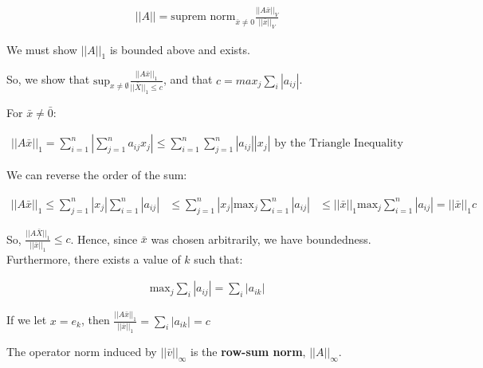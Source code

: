 \begin{align*}
  ||A|| = \text{suprem norm}_{\bar{x} \neq 0} \frac{||A\bar{x}||_V}{||\bar{x}||_V}
\end{align*}

We must show $||A||_1$ is bounded above and exists.

So, we show that $\text{sup}_{x \neq \emptyset} \frac{||A\bar{x}||_1}{||\bar{X}||_1 \leq c}$, and that $c = max_j \sum_i |a_{ij}|$.

For $\bar{x} \neq \bar{0}$:

\begin{align*}
  ||A\bar{x}||_1 = \sum_{i=1}^n |\sum_{j=1}^n a_{ij} x_j| \leq \sum_{i=1}^n \sum_{j=1}^n |a_{ij}| |x_j|\text{ by the Triangle Inequality}
\end{align*}

We can reverse the order of the sum:

\begin{align*}
  ||A\bar{x}||_1 \leq \sum_{j=1}^n |x_j| \sum_{i=1}^n |a_{ij}| &\leq \sum_{j=1}^n |x_j| \text{max}_j \sum_{i=1}^n |a_{ij}|
  &\leq ||\bar{x}||_1 \text{max}_j \sum_{i=1}^n |a_{ij}| = ||\bar{x}||_1 c
\end{align*}

So, $\frac{||A\bar{X}||_1}{||\bar{x}||_1} \leq c$. Hence, since $\bar{x}$ was chosen arbitrarily, we have boundedness. Furthermore, there exists a value of $k$ such that:

\begin{align*}
  \text{max}_j \sum_i |a_{ij}| = \sum_i |a_{ik}|
\end{align*}

If we let $x = e_k$, then $\frac{||A\bar{x}||_1}{||\bar{x}||_1} = \sum_i |a_{ik}| = c$

The operator norm induced by $||\bar{v}||_\infty$ is the \textbf{row-sum norm}, $||A||_\infty$.